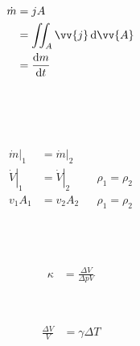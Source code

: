 \begin{boxleft}
\\
\end{boxleft}\begin{boxrightshaded}
\begin{align}
\dot{m}&=jA\\
&=\iint_A \vv{j} \diff\vv{A}\\
&=\frac{\diff m}{\diff t}
\end{align}
\end{boxrightshaded}

\begin{boxleft}
\\
\\
\\
\end{boxleft}\begin{boxrightshaded}
\begin{align}
\left.\dot{m}\right|_1&=\left.\dot{m}\right|_2\\
\left.\dot{V}\right|_1&=\left.\dot{V}\right|_2&&\rho_1=\rho_2\\
v_1A_1&=v_2A_2&&\rho_1=\rho_2
\end{align}
\end{boxrightshaded}

\begin{boxleft}
\\
\\
\end{boxleft}\begin{boxrightshaded}
\begin{align}
\kappa&=\frac{\Delta V}{\Delta p V}
\end{align}
\end{boxrightshaded}

\begin{boxleft}
\\
\end{boxleft}\begin{boxrightshaded}
\begin{align}
\frac{\Delta V}{V}&= \gamma \Delta T
\end{align}
\end{boxrightshaded}

